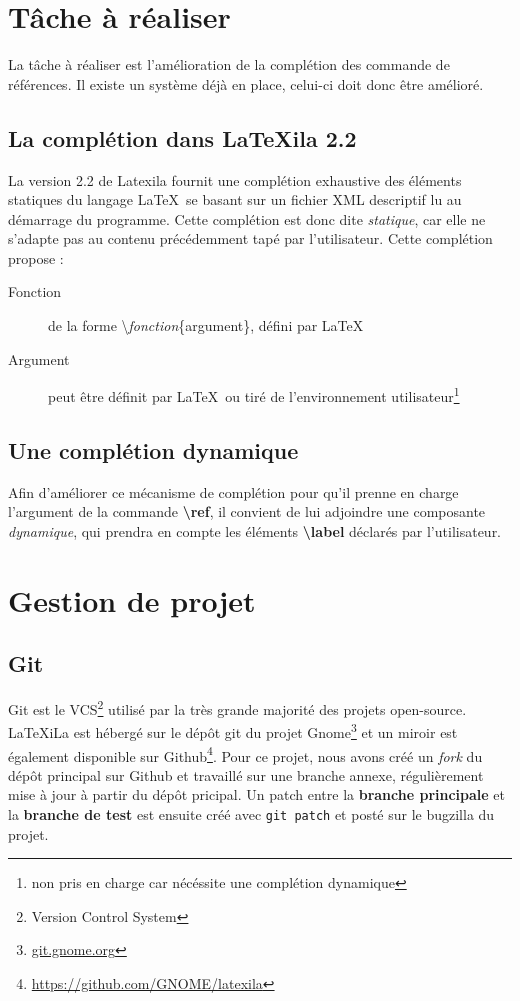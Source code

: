 \documentclass[a4paper,11pt]{report}
\begin{document}
\section{Tâche à réaliser} %
\label{sec:tache_a_realiser}
La tâche à réaliser est l'amélioration de la complétion des commande de références. Il existe un système déjà en place, celui-ci doit donc être amélioré.

\subsection{La complétion dans LaTeXila 2.2}
\label{sub:completion}
La version 2.2 de Latexila fournit une complétion exhaustive des éléments statiques du langage \LaTeX~se basant sur un fichier XML descriptif lu au démarrage du programme.
Cette complétion est donc dite \textit{statique}, car elle ne s'adapte pas au contenu précédemment tapé par l'utilisateur. Cette complétion propose :

\begin{description}
  \item[Fonction] de la forme \textbackslash\textit{fonction}\{argument\}, défini par \LaTeX
  \item[Argument] peut être définit par \LaTeX~ou tiré de l'environnement utilisateur\footnote{non pris en charge car nécéssite une complétion dynamique}
\end{description}

\subsection{Une complétion dynamique}
\label{sub:completion_dyn}
Afin d'améliorer ce mécanisme de complétion pour qu'il prenne en charge l'argument de la commande \textbf{\textbackslash{}ref}, il convient de lui adjoindre une composante \textit{dynamique}, qui prendra en compte les éléments \textbf{\textbackslash{}label} déclarés par l'utilisateur.

\section{Gestion de projet} %

\subsection{Git}
\label{sub:git}
Git est le VCS\footnote{Version Control System} utilisé par la très grande majorité des projets open-source. LaTeXiLa est hébergé sur le dépôt git du projet Gnome\footnote{\url{git.gnome.org}}  et un miroir est également disponible sur Github\footnote{\url{https://github.com/GNOME/latexila}}.
Pour ce projet, nous avons créé un \textit{fork} du dépôt principal sur Github et travaillé sur une branche annexe, régulièrement mise à jour à partir du dépôt pricipal.
Un patch entre la \textbf{branche principale} et la \textbf{branche de test} est ensuite créé avec \texttt{git patch} et posté sur le bugzilla du projet.
\end{document}
